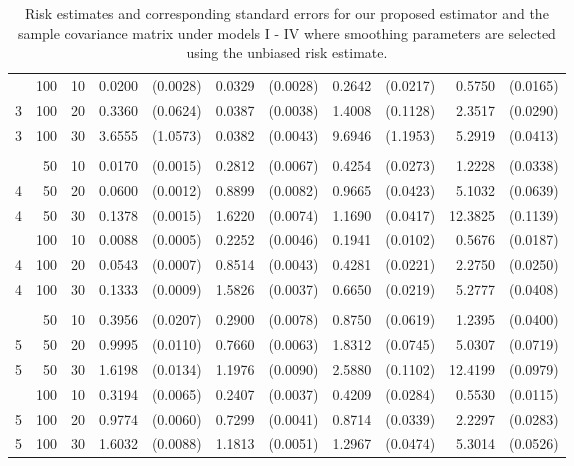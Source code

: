 \documentclass[12pt]{article}
\theoremstyle{definition}
\begin{document}
\begin{table}[H]
\begin{tabular}{lrrrrrrrrrr}
      \hdashline
  3 & 100 & 10 & 0.0200 &(0.0028) & 0.0329 & (0.0028) & 0.2642 & (0.0217) & 0.5750 & (0.0165) \\ 
  3 & 100 & 20 & 0.3360 & (0.0624) & 0.0387 & (0.0038) & 1.4008 & (0.1128) & 2.3517 & (0.0290) \\ 
  3 & 100 & 30 & 3.6555 & (1.0573) & 0.0382 & (0.0043) & 9.6946 & (1.1953) & 5.2919 & (0.0413) \\ 
      \hdashline \\
      \hdashline
  4 & 50 & 10 & 0.0170 & (0.0015) & 0.2812 & (0.0067) & 0.4254 & (0.0273) & 1.2228 & (0.0338) \\ 
  4 & 50 & 20 & 0.0600 & (0.0012) & 0.8899 & (0.0082) & 0.9665 & (0.0423) & 5.1032 & (0.0639) \\ 
  4 & 50 & 30 & 0.1378 & (0.0015) & 1.6220 & (0.0074) & 1.1690 & (0.0417) & 12.3825 & (0.1139) \\ 
      \hdashline
  4 & 100 & 10 & 0.0088 & (0.0005) & 0.2252 & (0.0046) & 0.1941 & (0.0102) & 0.5676 & (0.0187) \\ 
  4 & 100 & 20 & 0.0543 & (0.0007) & 0.8514 & (0.0043) & 0.4281 & (0.0221) & 2.2750 & (0.0250) \\ 
  4 & 100 & 30 & 0.1333 & (0.0009) & 1.5826 & (0.0037) & 0.6650 & (0.0219) & 5.2777 & (0.0408) \\ 
      \hdashline \\
      \hdashline
  5 & 50 & 10 & 0.3956 & (0.0207) & 0.2900 & (0.0078) & 0.8750 & (0.0619) & 1.2395 & (0.0400) \\ 
  5 & 50 & 20 & 0.9995 & (0.0110) & 0.7660 & (0.0063) & 1.8312 & (0.0745) & 5.0307 & (0.0719) \\ 
  5 & 50 & 30 & 1.6198 & (0.0134) & 1.1976 & (0.0090) & 2.5880 & (0.1102) & 12.4199 & (0.0979) \\ 
      \hdashline
  5 & 100 & 10 & 0.3194 & (0.0065) & 0.2407 & (0.0037) & 0.4209 & (0.0284) & 0.5530 & (0.0115) \\ 
  5 & 100 & 20 & 0.9774 & (0.0060) & 0.7299 & (0.0041) & 0.8714 & (0.0339) & 2.2297 & (0.0283) \\ 
  5 & 100 & 30 & 1.6032 & (0.0088) & 1.1813 & (0.0051) & 1.2967 & (0.0474) & 5.3014 & (0.0526) \\ 
   \hline
\end{tabular}
\caption{Risk estimates and corresponding standard errors for our proposed estimator and the sample covariance matrix under models I - IV where smoothing parameters are selected using the unbiased risk estimate.} 
\end{table}
\end{document}
